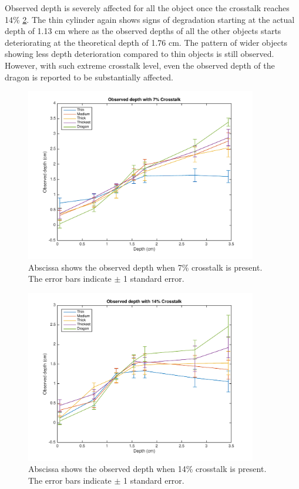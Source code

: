 Observed depth is severely affected for all the object once the crosstalk reaches 14\% \ref{fig:s_crosstalk_14}. The thin cylinder again shows signs of degradation starting at the actual depth of 1.13 cm where as the observed depths of all the other objects starts deteriorating at the theoretical depth of 1.76 cm. The pattern of wider objects showing less depth deterioration compared to thin objects is still observed. However, with such extreme crosstalk level, even the observed depth of the dragon is reported to be substantially affected.

\begin{figure}[H]
\centering
    \includegraphics[width=0.9\textwidth]{./Template_Figures/s_crosstalk_7}
    \caption{Abscissa shows the observed depth when 7\% crosstalk is present. The error bars indicate $\pm$ 1 standard error.\label{fig:s_crosstalk_7}}
\end{figure}

\begin{figure}[H]
\centering
    \includegraphics[width=0.9\textwidth]{./Template_Figures/s_crosstalk_14}
    \caption{Abscissa shows the observed depth when 14\% crosstalk is present. The error bars indicate $\pm$ 1 standard error.\label{fig:s_crosstalk_14}}
\end{figure}



